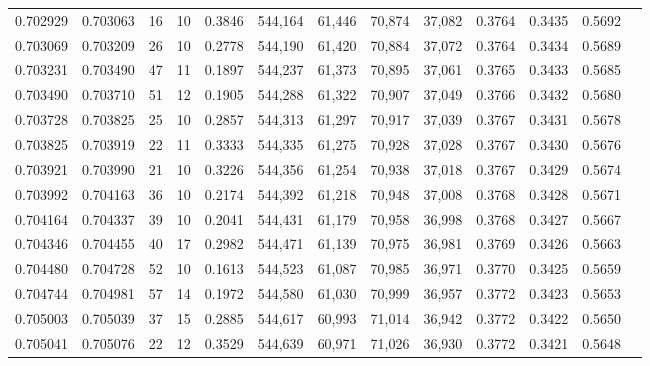 \begin{tabular}{rrrrrrrrrrrrr}
0.702929 & 0.703063 &    16 &  10 &                                     0.3846 & 544,164 &  61,446 &  70,874 &  37,082 & 0.3764 & 0.3435 & 0.5692 \\
0.703069 & 0.703209 &    26 &  10 &                                     0.2778 & 544,190 &  61,420 &  70,884 &  37,072 & 0.3764 & 0.3434 & 0.5689 \\
0.703231 & 0.703490 &    47 &  11 &                                     0.1897 & 544,237 &  61,373 &  70,895 &  37,061 & 0.3765 & 0.3433 & 0.5685 \\
0.703490 & 0.703710 &    51 &  12 &                                     0.1905 & 544,288 &  61,322 &  70,907 &  37,049 & 0.3766 & 0.3432 & 0.5680 \\
0.703728 & 0.703825 &    25 &  10 &                                     0.2857 & 544,313 &  61,297 &  70,917 &  37,039 & 0.3767 & 0.3431 & 0.5678 \\
0.703825 & 0.703919 &    22 &  11 &                                     0.3333 & 544,335 &  61,275 &  70,928 &  37,028 & 0.3767 & 0.3430 & 0.5676 \\
0.703921 & 0.703990 &    21 &  10 &                                     0.3226 & 544,356 &  61,254 &  70,938 &  37,018 & 0.3767 & 0.3429 & 0.5674 \\
0.703992 & 0.704163 &    36 &  10 &                                     0.2174 & 544,392 &  61,218 &  70,948 &  37,008 & 0.3768 & 0.3428 & 0.5671 \\
0.704164 & 0.704337 &    39 &  10 &                                     0.2041 & 544,431 &  61,179 &  70,958 &  36,998 & 0.3768 & 0.3427 & 0.5667 \\
0.704346 & 0.704455 &    40 &  17 &                                     0.2982 & 544,471 &  61,139 &  70,975 &  36,981 & 0.3769 & 0.3426 & 0.5663 \\
0.704480 & 0.704728 &    52 &  10 &                                     0.1613 & 544,523 &  61,087 &  70,985 &  36,971 & 0.3770 & 0.3425 & 0.5659 \\
0.704744 & 0.704981 &    57 &  14 &                                     0.1972 & 544,580 &  61,030 &  70,999 &  36,957 & 0.3772 & 0.3423 & 0.5653 \\
0.705003 & 0.705039 &    37 &  15 &                                     0.2885 & 544,617 &  60,993 &  71,014 &  36,942 & 0.3772 & 0.3422 & 0.5650 \\
0.705041 & 0.705076 &    22 &  12 &                                     0.3529 & 544,639 &  60,971 &  71,026 &  36,930 & 0.3772 & 0.3421 & 0.5648 \\

\end{tabular}
